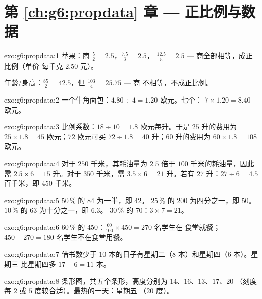 \section*{第 \ref{ch:g6:propdata} 章 --- 正比例与数据}

\begin{solution}{exo:g6:propdata:1}
苹果：商 $\frac52 = 2.5$，$\frac{7.5}{3} = 2.5$，
$\frac{12.5}{5} = 2.5$ --- 商全部相等，成正比例（单价
每千克 $2.50$ 元）。

年龄/身高：$\frac{85}{2} = 42.5$，但 $\frac{103}{4} = 25.75$ --- 商
不相等，不成正比例。
\end{solution}

\begin{solution}{exo:g6:propdata:2}
一个牛角面包：$4.80 \div 4 = 1.20$ 欧元。七个：
$7 \times 1.20 = 8.40$ 欧元。
\end{solution}

\begin{solution}{exo:g6:propdata:3}
比例系数：$18 \div 10 = 1.8$ 欧元每升。于是
$25$ 升的费用为 $25 \times 1.8 = 45$ 欧元；$72$ 欧元可买
$72 \div 1.8 = 40$ 升；$60$ 升的费用为 $60 \times 1.8 = 108$ 欧元。
\end{solution}

\begin{solution}{exo:g6:propdata:4}
对于 $250$ 千米，其耗油量为 $2.5$ 倍于 $100$ 千米的耗油量，因此
需 $2.5 \times 6 = 15$ 升。对于 $350$ 千米，需 $3.5 \times 6 = 21$ 升。若有
$27$ 升：$27 \div 6 = 4.5$ 百千米，即 $450$ 千米。
\end{solution}

\begin{solution}{exo:g6:propdata:5}
$50\,\%$ 的 $84$ 为一半，即 $42$。\quad
$25\,\%$ 的 $200$ 为四分之一，即 $50$。\quad
$10\,\%$ 的 $63$ 为十分之一，即 $6.3$。\quad
$30\,\%$ 的 $70$：$3 \times 7 = 21$。
\end{solution}

\begin{solution}{exo:g6:propdata:6}
$60\,\%$ 的 $450$：$\frac{60}{100} \times 450 = 270$ 名学生在
食堂就餐；$450 - 270 = 180$ 名学生不在食堂用餐。
\end{solution}

\begin{solution}{exo:g6:propdata:7}
借书数少于 $10$ 本的日子有星期二（$8$ 本）和星期四（$6$ 本）。星期三
比星期四多 $17 - 6 = 11$ 本。
\end{solution}

\begin{solution}{exo:g6:propdata:8}
条形图，共五个条形，高度分别为 $14$、$16$、$13$、$17$、$20$
（刻度每 $2$ 或 $5$ 度较合适）。最热的一天：星期五
（$20$ 度）。
\end{solution}

